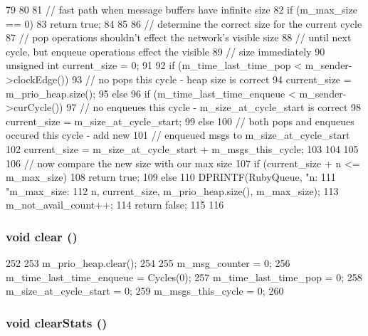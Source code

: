 \begin{DoxyCode}
79 {
80 
81     // fast path when message buffers have infinite size
82     if (m_max_size == 0) {
83         return true;
84     }
85 
86     // determine the correct size for the current cycle
87     // pop operations shouldn't effect the network's visible size
88     // until next cycle, but enqueue operations effect the visible
89     // size immediately
90     unsigned int current_size = 0;
91 
92     if (m_time_last_time_pop < m_sender->clockEdge()) {
93         // no pops this cycle - heap size is correct
94         current_size = m_prio_heap.size();
95     } else {
96         if (m_time_last_time_enqueue < m_sender->curCycle()) {
97             // no enqueues this cycle - m_size_at_cycle_start is correct
98             current_size = m_size_at_cycle_start;
99         } else {
100             // both pops and enqueues occured this cycle - add new
101             // enqueued msgs to m_size_at_cycle_start
102             current_size = m_size_at_cycle_start + m_msgs_this_cycle;
103         }
104     }
105 
106     // now compare the new size with our max size
107     if (current_size + n <= m_max_size) {
108         return true;
109     } else {
110         DPRINTF(RubyQueue, "n: %
111                 "m_max_size: %
112                 n, current_size, m_prio_heap.size(), m_max_size);
113         m_not_avail_count++;
114         return false;
115     }
116 }
\end{DoxyCode}
\hypertarget{classMessageBuffer_ac8bb3912a3ce86b15842e79d0b421204}{
\subsubsection[{clear}]{\setlength{\rightskip}{0pt plus 5cm}void clear ()}}
\label{classMessageBuffer_ac8bb3912a3ce86b15842e79d0b421204}



\begin{DoxyCode}
252 {
253     m_prio_heap.clear();
254 
255     m_msg_counter = 0;
256     m_time_last_time_enqueue = Cycles(0);
257     m_time_last_time_pop = 0;
258     m_size_at_cycle_start = 0;
259     m_msgs_this_cycle = 0;
260 }
\end{DoxyCode}
\hypertarget{classMessageBuffer_ac7ec7476159db4e2bb0372e30010fc9e}{
\subsubsection[{clearStats}]{\setlength{\rightskip}{0pt plus 5cm}void clearStats ()}}
\label{classMessageBuffer_ac7ec7476159db4e2bb0372e30010fc9e}



